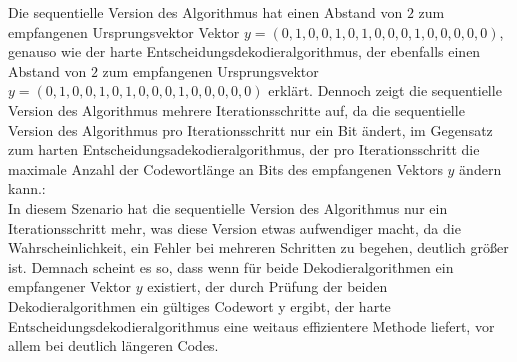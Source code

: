 \begin{Beispiel}
    Die sequentielle Version des Algorithmus hat einen Abstand von $2$ zum empfangenen Ursprungsvektor Vektor $y = (0,1,0,0,1,0,1,0,0,0,1,0,0,0,0,0)$, 
    genauso wie der harte Entscheidungsdekodieralgorithmus, der ebenfalls einen Abstand von $2$ zum empfangenen Ursprungsvektor $y = (0,1,0,0,1,0,1,0,0,0,1,0,0,0,0,0)$ erklärt.
    Dennoch zeigt die sequentielle Version des Algorithmus mehrere Iterationsschritte auf,
    da die sequentielle Version des Algorithmus pro Iterationsschritt nur ein Bit ändert,
    im Gegensatz zum harten Entscheidungsadekodieralgorithmus, der pro Iterationsschritt die maximale Anzahl der Codewortlänge an Bits des empfangenen Vektors $y$ ändern kann.:\\
    
    In diesem Szenario hat die sequentielle Version des Algorithmus nur ein Iterationsschritt mehr,
    was diese Version etwas aufwendiger macht, da die Wahrscheinlichkeit, ein Fehler bei mehreren Schritten zu begehen,
    deutlich grö\ss{}er ist. Demnach scheint es so, dass wenn für beide Dekodieralgorithmen ein empfangener Vektor $y$ existiert,
    der durch Prüfung der beiden Dekodieralgorithmen ein gültiges Codewort y ergibt, 
    der harte Entscheidungsdekodieralgorithmus  eine weitaus effizientere Methode liefert, vor allem bei deutlich längeren Codes.\\
    
\end{Beispiel}



